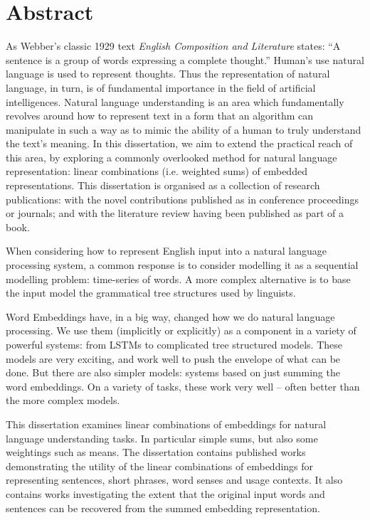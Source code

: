 \documentclass{book}
\begin{document}
\chapter*{Abstract}
As Webber's classic 1929 text \textit{English Composition and Literature} states:
``A sentence is a group of words expressing a complete thought.''
Human's use natural language is used to represent thoughts.
Thus the representation of natural language, in turn, is of fundamental importance in the field of artificial intelligences.
Natural language understanding is an area which fundamentally revolves around how to represent text in a form that an algorithm can manipulate in such a way as to mimic the ability of a human to truly understand the text's meaning.
In this dissertation, we aim to extend the practical reach of this area,
by exploring a commonly overlooked method for natural language representation: linear combinations (i.e. weighted sums) of embedded representations.
This dissertation is organised as a collection of research publications: with the novel contributions published as in conference proceedings or journals; and with the literature review having been published as part of a book.

When considering how to represent English input into a natural language processing system,
a common response is to consider modelling it as a sequential modelling problem: time-series of words.
A more complex alternative is to base the input model the grammatical tree structures used by linguists.




Word Embeddings have, in a big way, changed how we do natural language processing.
We use them (implicitly or explicitly) as a component in a variety of powerful systems:
from LSTMs to complicated tree structured models.
These models are very exciting, and work well to push the envelope of what can be done.
But there are also simpler models: systems based on just summing the word embeddings.
On a variety of tasks, these work very well -- often better than the more complex models.

This dissertation examines linear combinations of embeddings for natural language understanding tasks.
In particular simple sums, but also some weightings such as means.
The dissertation contains published works demonstrating the utility of the linear combinations of embeddings
for representing sentences, short phrases, word senses and usage contexts.
It also contains works investigating the extent that the original input words and sentences can be recovered from the summed embedding representation.
\end{document}
